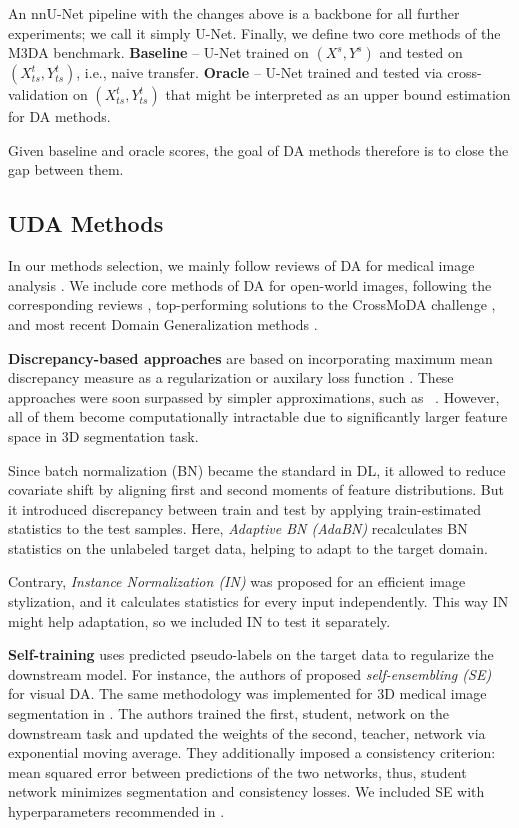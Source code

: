An nnU-Net pipeline with the changes above is a backbone for all further experiments; we call it simply U-Net. Finally, we define two core methods of the M3DA benchmark. \textbf{Baseline} -- U-Net trained on $(X^s, Y^s)$ and tested on $(X^t_{ts}, Y^t_{ts})$, i.e., naive transfer. \textbf{Oracle} -- U-Net trained and tested via cross-validation on $(X^t_{ts}, Y^t_{ts})$ that might be interpreted as an upper bound estimation for DA methods.

Given baseline and oracle scores, the goal of DA methods therefore is to close the gap between them.


\subsection{UDA Methods}
\label{ssec:uda}

In our methods selection, we mainly follow reviews of DA for medical image analysis \cite{medim_da_survey_2021,medim_da_survey_2023}. We include core methods of DA for open-world images, following the corresponding reviews \cite{da_survey_2018,uda_survey_2020,uda_segm_review_2020}, top-performing solutions to the CrossMoDA challenge \cite{crossmoda}, and most recent Domain Generalization methods \cite{dg_tta}.%


\textbf{Discrepancy-based approaches} are based on incorporating maximum mean discrepancy measure as a regularization or auxilary loss function \cite{mmd_ghifary2014domain,mmd_tzeng2014deep,mmd_long2015learning}. These approaches were soon surpassed by simpler approximations, such as ~\cite{deepcoral}. However, all of them become computationally intractable due to significantly larger feature space in 3D segmentation task.

Since batch normalization (BN) \cite{bn} became the standard in DL, it allowed to reduce covariate shift by aligning first and second moments of feature distributions. But it introduced discrepancy between train and test by applying train-estimated statistics to the test samples. Here, \textit{Adaptive BN (AdaBN)} \cite{adabn} recalculates BN statistics on the unlabeled target data, helping to adapt to the target domain.

Contrary, \textit{Instance Normalization (IN)} \cite{instance_norm} was proposed for an efficient image stylization, and it calculates statistics for every input independently. This way IN might help adaptation, so we included IN to test it separately.


\textbf{Self-training} uses predicted pseudo-labels on the target data to regularize the downstream model. For instance, the authors of \cite{se} proposed \textit{self-ensembling (SE)} for visual DA. The same methodology was implemented for 3D medical image segmentation in \cite{se_medim}. The authors trained the first, student, network on the downstream task and updated the weights of the second, teacher, network via exponential moving average. They additionally imposed a consistency criterion: mean squared error between predictions of the two networks, thus, student network minimizes segmentation and consistency losses. We included SE with hyperparameters recommended in \cite{se_medim}.

